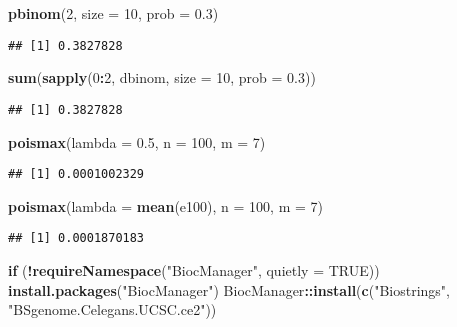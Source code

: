 \documentclass[]{article}
\newenvironment{Shaded}{\begin{snugshade}}{\end{snugshade}}
\newcommand{\KeywordTok}[1]{\textcolor[rgb]{0.13,0.29,0.53}{\textbf{#1}}}
\newcommand{\DataTypeTok}[1]{\textcolor[rgb]{0.13,0.29,0.53}{#1}}
\newcommand{\DecValTok}[1]{\textcolor[rgb]{0.00,0.00,0.81}{#1}}
\newcommand{\FloatTok}[1]{\textcolor[rgb]{0.00,0.00,0.81}{#1}}
\newcommand{\StringTok}[1]{\textcolor[rgb]{0.31,0.60,0.02}{#1}}
\newcommand{\OtherTok}[1]{\textcolor[rgb]{0.56,0.35,0.01}{#1}}
\newcommand{\ControlFlowTok}[1]{\textcolor[rgb]{0.13,0.29,0.53}{\textbf{#1}}}
\newcommand{\OperatorTok}[1]{\textcolor[rgb]{0.81,0.36,0.00}{\textbf{#1}}}
\newcommand{\NormalTok}[1]{#1}
\begin{document}
\begin{Shaded}
\begin{Highlighting}[]
\KeywordTok{pbinom}\NormalTok{(}\DecValTok{2}\NormalTok{, }\DataTypeTok{size =} \DecValTok{10}\NormalTok{, }\DataTypeTok{prob =} \FloatTok{0.3}\NormalTok{)}
\end{Highlighting}
\end{Shaded}

\begin{verbatim}
## [1] 0.3827828
\end{verbatim}

\begin{Shaded}
\begin{Highlighting}[]
\KeywordTok{sum}\NormalTok{(}\KeywordTok{sapply}\NormalTok{(}\DecValTok{0}\OperatorTok{:}\DecValTok{2}\NormalTok{, dbinom, }\DataTypeTok{size =} \DecValTok{10}\NormalTok{, }\DataTypeTok{prob =} \FloatTok{0.3}\NormalTok{))}
\end{Highlighting}
\end{Shaded}

\begin{verbatim}
## [1] 0.3827828
\end{verbatim}

\begin{Shaded}
\begin{Highlighting}[]
\KeywordTok{poismax}\NormalTok{(}\DataTypeTok{lambda =} \FloatTok{0.5}\NormalTok{, }\DataTypeTok{n =} \DecValTok{100}\NormalTok{, }\DataTypeTok{m =} \DecValTok{7}\NormalTok{)}
\end{Highlighting}
\end{Shaded}

\begin{verbatim}
## [1] 0.0001002329
\end{verbatim}

\begin{Shaded}
\begin{Highlighting}[]
\KeywordTok{poismax}\NormalTok{(}\DataTypeTok{lambda =} \KeywordTok{mean}\NormalTok{(e100), }\DataTypeTok{n =} \DecValTok{100}\NormalTok{, }\DataTypeTok{m =} \DecValTok{7}\NormalTok{)}
\end{Highlighting}
\end{Shaded}

\begin{verbatim}
## [1] 0.0001870183
\end{verbatim}

\begin{Shaded}
\begin{Highlighting}[]
\ControlFlowTok{if}\NormalTok{ (}\OperatorTok{!}\KeywordTok{requireNamespace}\NormalTok{(}\StringTok{"BiocManager"}\NormalTok{, }\DataTypeTok{quietly =} \OtherTok{TRUE}\NormalTok{))}
     \KeywordTok{install.packages}\NormalTok{(}\StringTok{"BiocManager"}\NormalTok{)}
\NormalTok{BiocManager}\OperatorTok{::}\KeywordTok{install}\NormalTok{(}\KeywordTok{c}\NormalTok{(}\StringTok{"Biostrings"}\NormalTok{, }\StringTok{"BSgenome.Celegans.UCSC.ce2"}\NormalTok{))}
\end{Highlighting}
\end{Shaded}
\end{document}

